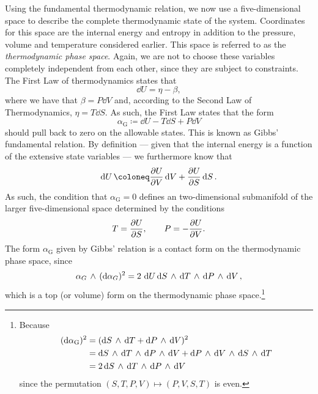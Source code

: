 Using the fundamental thermodynamic relation, we now use a five-dimensional space to describe the complete thermodynamic state of the system. Coordinates for this space are the internal energy and entropy in addition to the pressure, volume and temperature considered earlier. This space is referred to as the \emph{thermodynamic phase space}. Again, we are not to choose these variables completely independent from each other, since they are subject to constraints. The First Law of thermodynamics states that
$$ \dd{U} = \eta - \beta, $$
where we have that $ \beta = P\dd{V} $ and, according to the Second Law of Thermodynamics, $\eta = T\dd{S}$. As such, the First Law states that the form
\begin{equation} 
    \alpha_\text{G} \coloneq \dd{U} - T\dd{S} + P\dd{V}
    \label{eq:gibbs_relation}
\end{equation}
should pull back to zero on the allowable states. This is known as Gibbs' fundamental relation. By definition --- given that the internal energy is a function of the extensive state variables ---  we furthermore know that
$$ \dd{U} \coloneq \pdv{U}{V}\dd{V} + \pdv{U}{S}\dd{S}.$$
As such, the condition that $\alpha_\text{G} = 0$ defines an two-dimensional submanifold of the larger five-dimensional space determined by the conditions
\begin{equation}
    T = \pdv{U}{S}, \qquad P = -\pdv{U}{V}. 
\end{equation}
The form $\alpha_\text{G}$ given by Gibbs' relation is a contact form on the thermodynamic phase space, since
$$  \alpha_G\,\wedge\,(\dd{\alpha_G})^2  = 2\,\dd{U}  \dd{S}\,\wedge\,\dd{T} \,\wedge\, \dd{P}\,\wedge\,\dd{V}  , $$
which is a top (or volume) form on the thermodynamic phase space.\footnote
{
    Because 
    \begin{equation*} 
        \begin{split}
            (\dd{\alpha_\text{G}})^2 &= ( \dd{S}\,\wedge\,\dd{T}  +  \dd{P}\,\wedge\,\dd{V} )^2 \\
                            &=   \dd{S}\,\wedge\,\dd{T} \,\wedge\, \dd{P}\,\wedge\,\dd{V}   +   \dd{P}\,\wedge\,\dd{V} \,\wedge\, \dd{S}\,\wedge\,\dd{T}   \\
                            &= 2  \dd{S}\,\wedge\,\dd{T} \,\wedge\, \dd{P}\,\wedge\,\dd{V}   \\
        \end{split}
    \end{equation*}
    since the permutation $ (S, T, P, V) \mapsto (P, V, S, T) $ is even.
}

